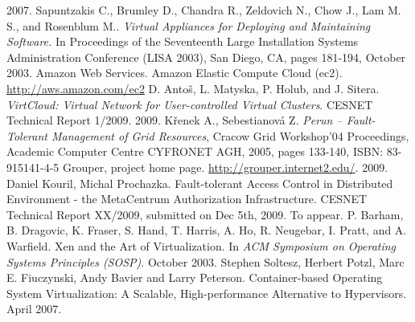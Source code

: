 \documentclass[a4paper]{article}
\begin{document}
\begin{thebibliography}{10}
	2007.
	 Sapuntzakis C., Brumley D., Chandra R., Zeldovich N., Chow J., Lam M. S., and Rosenblum M..
	\emph{Virtual Appliances for Deploying and Maintaining Software.}
	In Proceedings of the Seventeenth Large Installation Systems Administration Conference (LISA 2003), San Diego, CA, pages 181-194, October 2003.
	Amazon Web Services. Amazon Elastic Compute Cloud (ec2). \url{http://aws.amazon.com/ec2}
         D. Anto\v s, L. Matyska, P. Holub, and J.
        Sitera.
        \emph{VirtCloud: Virtual Network for User-controlled Virtual
        Clusters}. CESNET Technical Report 1/2009. 2009.
         K\v renek A., Sebestianov\'a Z. \emph{Perun -- 
        Fault-Tolerant Management of Grid Resources}, Cracow Grid
        Workshop'04 Proceedings, Academic Computer Centre CYFRONET
        AGH, 2005, pages 133-140, ISBN: 83-915141-4-5
Grouper, project home page. 
\url{http://grouper.internet2.edu/}. 2009.
 Daniel Kouril, Michal Prochazka.
Fault-tolerant Access Control in Distributed Environment
- the MetaCentrum Authorization Infrastructure.
CESNET Technical Report XX/2009, submitted on Dec 5th, 2009. To appear.
P. Barham, B. Dragovic, K. Fraser, S.
Hand, T. Harris, A. Ho, R. Neugebar, I. Pratt, and A.
Warfield. Xen and the Art of Virtualization. In {\em ACM
Symposium on Operating Systems Principles (SOSP)}. October 2003.
Stephen Soltesz, Herbert Potzl, Marc E. Fiuczynski, Andy Bavier and Larry Peterson.
Container-based
Operating System Virtualization: A Scalable, High-performance Alternative to
Hypervisors. April 2007.
	\end{thebibliography}
\end{document}
